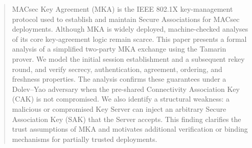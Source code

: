 
\begin{abstract}
MACsec Key Agreement (MKA) is the IEEE 802.1X key-management protocol used to establish and maintain Secure Associations for MACsec deployments. Although MKA is widely deployed, machine-checked analyses of its core key-agreement logic remain scarce. This paper presents a formal analysis of a simplified two-party MKA exchange using the Tamarin prover. We model the initial session establishment and a subsequent rekey round, and verify secrecy, authentication, agreement, ordering, and freshness properties. The analysis confirms these guarantees under a Dolev--Yao adversary when the pre-shared Connectivity Association Key (CAK) is not compromised. We also identify a structural weakness: a malicious or compromised Key Server can inject an arbitrary Secure Association Key (SAK) that the Server accepts. This finding clarifies the trust assumptions of MKA and motivates additional verification or binding mechanisms for partially trusted deployments.
\end{abstract}


